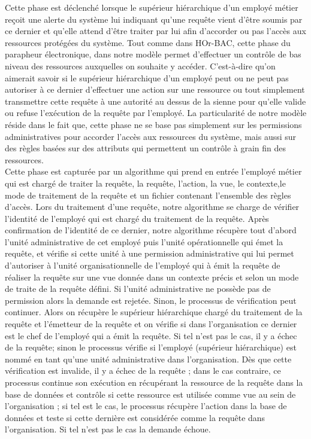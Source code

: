 \label{sectionPhasetraitement}

Cette phase est déclenché lorsque le supérieur hiérarchique d'un employé métier reçoit une alerte du système lui indiquant qu'une requête vient d'être soumis par ce dernier et qu'elle attend d'être traiter par lui afin d'accorder ou pas l'accès aux ressources protégées du système. Tout comme dans HOr-BAC, cette phase du parapheur électronique, dans notre modèle permet d'effectuer un contrôle de bas niveau des ressources auxquelles on souhaite y accéder. C'est-à-dire qu'on aimerait savoir si le supérieur hiérarchique d'un employé peut ou ne peut pas autoriser à ce dernier d'effectuer une action sur une ressource ou tout simplement transmettre cette requête à une autorité au dessus de la sienne pour qu'elle valide ou refuse l'exécution de la requête par l'employé. La particularité de notre modèle réside dans le fait que, cette phase ne se base pas simplement sur les permissions administratives pour accorder l'accès aux ressources du système, mais aussi sur des règles basées sur des attributs qui permettent un contrôle à grain fin des ressources.\\
\hspace*{0.5cm} Cette phase est capturée par un algorithme qui prend en entrée l'employé métier qui est chargé de traiter la requête, la requête, l'action, la vue, le contexte,le mode de traitement de la requête et un fichier contenant l'ensemble des règles d'accès. Lors du traitement d'une requête, notre algorithme se charge de vérifier l'identité de l'employé qui est chargé du traitement de la requête. Après confirmation de l'identité de ce dernier, notre algorithme récupère tout d'abord l'unité administrative de cet employé puis l'unité opérationnelle qui émet la requête, et vérifie si cette unité à une permission administrative qui lui permet d'autoriser à l'unité organisationnelle de l'employé qui à émit la requête de réaliser la requête sur une vue donnée dans un contexte précis et selon un mode de traite de la requête défini. Si l'unité administrative ne possède pas de permission alors la demande est rejetée. Sinon, le processus de vérification peut continuer. Alors on récupère le supérieur hiérarchique chargé du traitement de la requête et l'émetteur de la requête et on vérifie si dans l'organisation ce dernier est le chef de l'employé qui a émit la requête. Si tel n'est pas le cas, il y a échec de la requête; sinon le processus vérifie si l'employé (supérieur hiérarchique) est nommé en tant qu'une unité administrative dans l'organisation. Dès que cette vérification est invalide, il y a échec de la requête ; dans le cas contraire, ce processus continue son exécution en récupérant la ressource de la requête dans la base de données et contrôle si cette ressource est utilisée comme vue au sein de l'organisation ; si tel est le cas, le processus récupère l'action dans la base de données et teste si cette dernière est considérée comme la requête dans l'organisation. Si tel n'est pas le cas la demande échoue.\\
